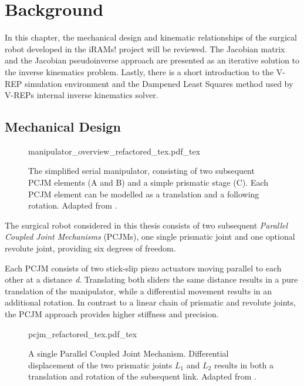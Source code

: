 \chapter{Background}

In this chapter, the mechanical design and kinematic relationships of the surgical robot developed in the iRAMs! project will be reviewed. The Jacobian matrix and the Jacobian pseudoinverse approach are presented as an iterative solution to the inverse kinematics problem. Lastly, there is a short introduction to the V-REP simulation environment and the Dampened Least Squares method used by V-REPs internal inverse kinematics solver. 

\section{Mechanical Design}
\begin{figure}[b!]
	\begin{center}
		{manipulator_overview_refactored_tex.pdf_tex}
		\caption{The simplified serial manipulator, consisting of two subsequent PCJM elements (A and B) and a simple prismatic stage (C). Each PCJM element can be modelled as a translation and a following rotation. Adapted from \cite{Master_thesis}.}
		\label{Manipulator}
	\end{center}
\end{figure}

The surgical robot considered in this thesis consists of two subsequent \textit{Parallel Coupled Joint Mechanisms} (PCJMs), one single prismatic joint and one optional revolute joint, providing six degrees of freedom.

Each PCJM consists of two stick-slip piezo actuators moving parallel to each other at a distance \textit{d}. 
Translating both sliders the same distance results in a pure translation of the manipulator, while a differential movement results in an additional rotation. In contrast to a linear chain of prismatic and revolute joints, the PCJM approach provides higher stiffness and precision. 

\begin{figure}[t!]
	{pcjm_refactored_tex.pdf_tex}
	\caption{A single Parallel Coupled Joint Mechanism. Differential displacement of the two prismatic joints $L_1$ and $L_2$ results in both a translation and rotation of the subsequent link. Adapted from \cite{Ali_FK}.}
	\label{pcjm}
\end{figure}

